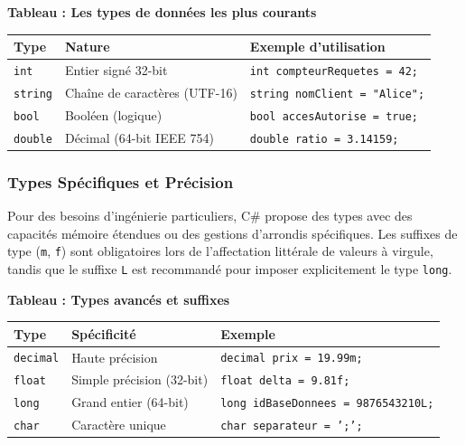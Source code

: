\begin{center}
    \textbf{Tableau : Les types de données les plus courants} \\[0.3cm]
    \begin{tabular}{@{}llp{6cm}@{}}
        \toprule
        \textbf{Type} & \textbf{Nature} & \textbf{Exemple d'utilisation} \\
        \midrule
        \texttt{int} & Entier signé 32-bit & \texttt{int compteurRequetes = 42;} \\
        \texttt{string} & Chaîne de caractères (UTF-16) & \texttt{string nomClient = "Alice";} \\
        \texttt{bool} & Booléen (logique) & \texttt{bool accesAutorise = true;} \\
        \texttt{double} & Décimal (64-bit IEEE 754) & \texttt{double ratio = 3.14159;} \\
        \bottomrule
    \end{tabular}
\end{center}

\subsubsection{Types Spécifiques et Précision}

Pour des besoins d'ingénierie particuliers, C\# propose des types avec des capacités mémoire étendues ou des gestions d'arrondis spécifiques. Les suffixes de type (\texttt{m}, \texttt{f}) sont obligatoires lors de l'affectation littérale de valeurs à virgule, tandis que le suffixe \texttt{L} est recommandé pour imposer explicitement le type \texttt{long}.

\begin{center}
    \textbf{Tableau : Types avancés et suffixes} \\[0.3cm]
    \begin{tabular}{@{}llp{6cm}@{}}
        \toprule
        \textbf{Type} & \textbf{Spécificité} & \textbf{Exemple} \\
        \midrule
        \texttt{decimal} & Haute précision & \texttt{decimal prix = 19.99m;} \\
        \texttt{float} & Simple précision (32-bit) & \texttt{float delta = 9.81f;} \\
        \texttt{long} & Grand entier (64-bit) & \texttt{long idBaseDonnees = 9876543210L;} \\
        \texttt{char} & Caractère unique & \texttt{char separateur = ';';} \\
        \bottomrule
    \end{tabular}
\end{center}

